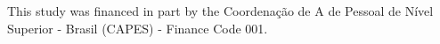 \documentclass[smallextended]{svjour3}       %
\begin{document}

%
%


\begin{acknowledgements}
This study was financed in part by the Coordenação de A de Pessoal de Nível Superior - Brasil (CAPES) - Finance Code 001.
\end{acknowledgements}
\end{document}
